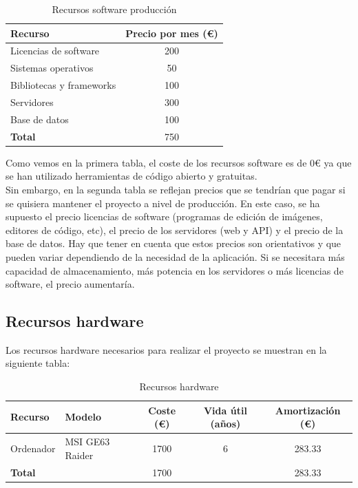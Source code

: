 \begin{table}[h]
    \centering
    \begin{tabular}{|l|c|}
        \hline
        \textbf{Recurso} & \textbf{Precio por mes (€)} \\ \hline
        Licencias de software & 200 \\ \hline
        Sistemas operativos & 50 \\ \hline
        Bibliotecas y frameworks & 100 \\ \hline
        Servidores & 300 \\ \hline
        Base de datos & 100 \\ \hline
        \hline
        \textbf{Total} & 750 \\ \hline
    \end{tabular}
    \caption{Recursos software producción}
    \label{tab:tabla_recursos_software_producion}
\end{table}

\newpage

Como vemos en la primera tabla, el coste de los recursos software es de 0€ ya que se han utilizado herramientas
de código abierto y gratuitas. \\

Sin embargo, en la segunda tabla se reflejan precios que se tendrían que pagar si se quisiera mantener el proyecto
a nivel de producción. En este caso, se ha supuesto el precio licencias de software (programas de edición de imágenes,
editores de código, etc), el precio de los servidores (web y API) y el precio de la base de datos. Hay que tener en cuenta que
estos precios son orientativos y que pueden variar dependiendo de la necesidad de la aplicación. Si se necesitara
más capacidad de almacenamiento, más potencia en los servidores o más licencias de software, el precio aumentaría.

\subsection{Recursos hardware}\label{subsec:recursos-hardware}

Los recursos hardware necesarios para realizar el proyecto se muestran en la siguiente tabla: \\

\begin{table}[h]
    \centering
    \begin{tabular}{|l|l|c|c|c|}
        \hline
        \textbf{Recurso} & \textbf{Modelo} & \textbf{Coste (€)} & \textbf{Vida útil (años)} & \textbf{Amortización (€)} \\ \hline
        Ordenador & MSI GE63 Raider & 1700 & 6 & 283.33 \\ \hline
        \hline
        \textbf{Total} & & 1700 & &  283.33 \\ \hline
    \end{tabular}
    \caption{Recursos hardware}
    \label{tab:tabla_recursos_hardware}
\end{table}

